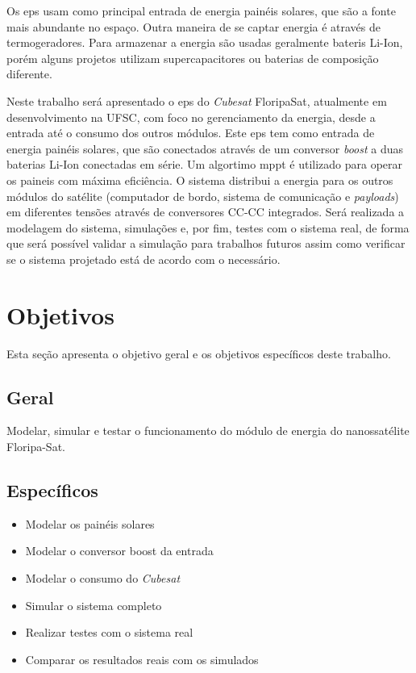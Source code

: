 Os \gls{eps} usam como principal entrada de energia painéis solares, que são a fonte mais abundante no espaço. Outra maneira de se captar energia é através de termogeradores. Para armazenar a energia são usadas geralmente bateris Li-Ion, porém alguns projetos utilizam supercapacitores ou baterias de composição diferente.

Neste trabalho será apresentado o \gls{eps} do \textit{Cubesat} FloripaSat, atualmente em desenvolvimento na UFSC, com foco no gerenciamento da energia, desde a entrada até o consumo dos outros módulos. Este \gls{eps} tem como entrada de energia painéis solares, que são conectados através de um conversor \textit{boost} a duas baterias Li-Ion conectadas em série. Um algortimo \gls{mppt} é utilizado para operar os paineis com máxima eficiência. O sistema distribui a energia para os outros módulos do satélite (computador de bordo, sistema de comunicação e \textit{payloads}) em diferentes tensões através de conversores CC-CC integrados. Será realizada a modelagem do sistema, simulações e, por fim, testes com o sistema real, de forma que será possível validar a simulação para trabalhos futuros assim como verificar se o sistema projetado está de acordo com o necessário.

\section{Objetivos}

Esta seção apresenta o objetivo geral e os objetivos específicos deste trabalho.

\subsection{Geral}

Modelar, simular e testar o funcionamento do módulo de energia do nanossatélite Floripa-Sat.

\subsection{Específicos}
\begin{itemize}
\item Modelar os painéis solares
\item Modelar o conversor boost da entrada
\item Modelar o consumo do \textit{Cubesat}
\item Simular o sistema completo
\item Realizar testes com o sistema real
\item Comparar os resultados reais com os simulados
\end{itemize}

